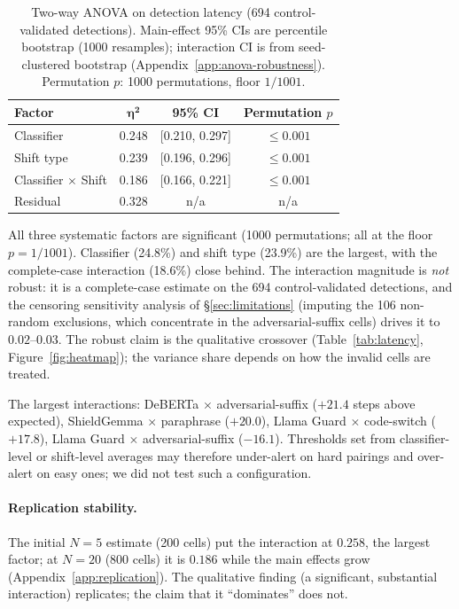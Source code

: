 \documentclass{article}
\begin{document}
\begin{table}[t]
\caption{Two-way ANOVA on detection latency (694 control-validated detections). Main-effect 95\% CIs are percentile bootstrap (1000 resamples); interaction CI is from seed-clustered bootstrap (Appendix~\ref{app:anova-robustness}). Permutation $p$: 1000 permutations, floor $1/1001$.}
\label{tab:anova}
\centering
\small
\begin{tabular}{lccc}
\toprule
\textbf{Factor} & $\boldsymbol{\eta^2}$ & \textbf{95\% CI} & \textbf{Permutation $p$} \\
\midrule
Classifier & 0.248 & [0.210, 0.297] & $\leq 0.001$ \\
Shift type & 0.239 & [0.196, 0.296] & $\leq 0.001$ \\
Classifier $\times$ Shift & 0.186 & [0.166, 0.221] & $\leq 0.001$ \\
Residual & 0.328 & n/a & n/a \\
\bottomrule
\end{tabular}
\end{table}

All three systematic factors are significant (1000 permutations; all at the floor $p = 1/1001$). Classifier (24.8\%) and shift type (23.9\%) are the largest, with the complete-case interaction (18.6\%) close behind. The interaction magnitude is \emph{not} robust: it is a complete-case estimate on the 694 control-validated detections, and the censoring sensitivity analysis of \S\ref{sec:limitations} (imputing the 106 non-random exclusions, which concentrate in the adversarial-suffix cells) drives it to $0.02$--$0.03$. The robust claim is the qualitative crossover (Table~\ref{tab:latency}, Figure~\ref{fig:heatmap}); the variance share depends on how the invalid cells are treated.

The largest interactions: DeBERTa $\times$ adversarial-suffix ($+21.4$ steps above expected), ShieldGemma $\times$ paraphrase ($+20.0$), Llama Guard $\times$ code-switch ($+17.8$), Llama Guard $\times$ adversarial-suffix ($-16.1$). Thresholds set from classifier-level or shift-level averages may therefore under-alert on hard pairings and over-alert on easy ones; we did not test such a configuration.

\paragraph{Replication stability.} The initial $N{=}5$ estimate (200 cells) put the interaction at $0.258$, the largest factor; at $N{=}20$ (800 cells) it is $0.186$ while the main effects grow (Appendix~\ref{app:replication}). The qualitative finding (a significant, substantial interaction) replicates; the claim that it ``dominates'' does not.
\end{document}
